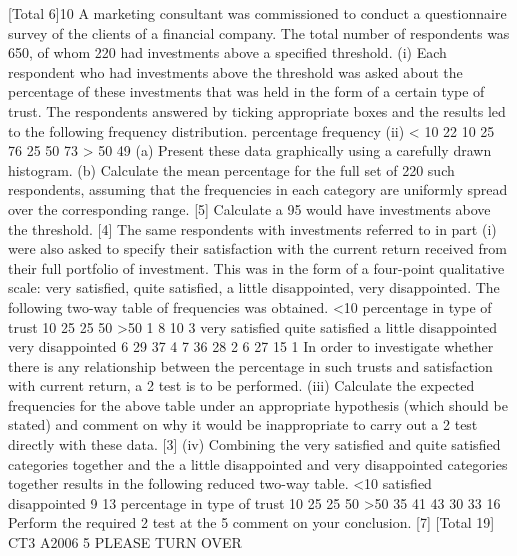 
[Total 6]10
A marketing consultant was commissioned to conduct a questionnaire survey of the
clients of a financial company. The total number of respondents was 650, of whom
220 had investments above a specified threshold.
(i)
Each respondent who had investments above the threshold was asked about
the percentage of these investments that was held in the form of a certain type
of trust. The respondents answered by ticking appropriate boxes and the
results led to the following frequency distribution.
percentage
frequency
(ii)
< 10
22
10 25
76
25 50
73
> 50
49
(a) Present these data graphically using a carefully drawn histogram.
(b) Calculate the mean percentage for the full set of 220 such respondents,
assuming that the frequencies in each category are uniformly spread
over the corresponding range.
[5]
Calculate a 95%
would have investments above the threshold.
[4]
The same respondents with investments referred to in part (i) were also asked to
specify their satisfaction with the current return received from their full portfolio of
investment. This was in the form of a four-point qualitative scale: very satisfied, quite
satisfied, a little disappointed, very disappointed. The following two-way table of
frequencies was obtained.
<10
percentage in type of trust
10 25
25 50
>50
1
8
10
3
very satisfied
quite satisfied
a little disappointed
very disappointed
6
29
37
4
7
36
28
2
6
27
15
1
In order to investigate whether there is any relationship between the percentage in
such trusts and satisfaction with current return, a 2 test is to be performed.
(iii) Calculate the expected frequencies for the above table under an appropriate
hypothesis (which should be stated) and comment on why it would be
inappropriate to carry out a 2 test directly with these data.
[3]
(iv) Combining the very satisfied and quite satisfied categories together and
the a little disappointed and very disappointed categories together results
in the following reduced two-way table.
<10
satisfied
disappointed
9
13
percentage in type of trust
10 25
25 50
>50
35
41
43
30
33
16
Perform the required 2 test at the 5%
comment on your conclusion.
[7]
[Total 19]
CT3 A2006 5
PLEASE TURN OVER

